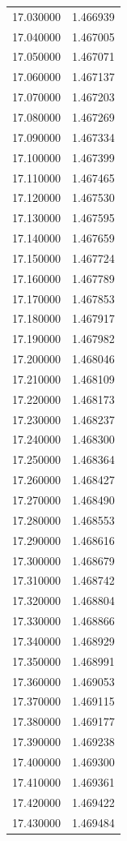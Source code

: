 \begin{tabular}{rr}
17.030000 & 1.466939 \\
17.040000 & 1.467005 \\
17.050000 & 1.467071 \\
17.060000 & 1.467137 \\
17.070000 & 1.467203 \\
17.080000 & 1.467269 \\
17.090000 & 1.467334 \\
17.100000 & 1.467399 \\
17.110000 & 1.467465 \\
17.120000 & 1.467530 \\
17.130000 & 1.467595 \\
17.140000 & 1.467659 \\
17.150000 & 1.467724 \\
17.160000 & 1.467789 \\
17.170000 & 1.467853 \\
17.180000 & 1.467917 \\
17.190000 & 1.467982 \\
17.200000 & 1.468046 \\
17.210000 & 1.468109 \\
17.220000 & 1.468173 \\
17.230000 & 1.468237 \\
17.240000 & 1.468300 \\
17.250000 & 1.468364 \\
17.260000 & 1.468427 \\
17.270000 & 1.468490 \\
17.280000 & 1.468553 \\
17.290000 & 1.468616 \\
17.300000 & 1.468679 \\
17.310000 & 1.468742 \\
17.320000 & 1.468804 \\
17.330000 & 1.468866 \\
17.340000 & 1.468929 \\
17.350000 & 1.468991 \\
17.360000 & 1.469053 \\
17.370000 & 1.469115 \\
17.380000 & 1.469177 \\
17.390000 & 1.469238 \\
17.400000 & 1.469300 \\
17.410000 & 1.469361 \\
17.420000 & 1.469422 \\
17.430000 & 1.469484 \\

\end{tabular}
